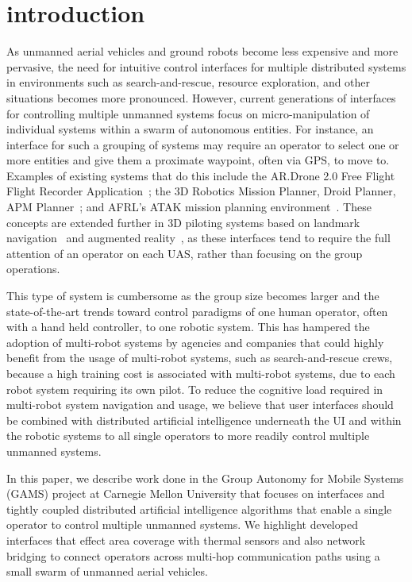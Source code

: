 \documentclass{sig-alternate-ipsn13}
\begin{document}
\section{introduction}

As unmanned aerial vehicles and ground robots become less expensive and more
pervasive, the need for intuitive control interfaces for multiple distributed
systems in environments such as search-and-rescue, resource exploration, and
other situations becomes more pronounced. However, current generations of
interfaces for controlling multiple unmanned systems focus on micro-manipulation
of individual systems within a swarm of autonomous entities. For instance, an
interface for such a grouping of systems may require an operator to select one
or more entities and give them a proximate waypoint, often via GPS, to move to.
Examples of existing systems that do this include the AR.Drone 2.0 Free Flight
Flight Recorder Application~\cite{irizarry2012usability};
the 3D Robotics Mission Planner, Droid Planner,
APM Planner~\cite{arora2013development}; and AFRL's ATAK mission
planning environment~\cite{gillen2012beyond}.
These concepts are extended further in 3D piloting systems based on landmark
navigation~\cite{ranft20133d} and augmented reality~\cite{kochflying}, as
these interfaces tend to require the full attention
of an operator on each UAS, rather than focusing on the group operations.

This type of system is cumbersome as the group size becomes larger and the
state-of-the-art trends toward control paradigms of one human operator, often
with a hand held controller, to one robotic system. This has hampered the
adoption of multi-robot systems by agencies and companies that could highly
benefit from the usage of multi-robot systems, such as search-and-rescue crews,
because a high training cost is associated with multi-robot systems, due to each
robot system requiring its own pilot. To reduce the cognitive load required in
multi-robot system navigation and usage, we believe that user interfaces should
be combined with distributed artificial intelligence underneath the UI and
within the robotic systems to all single operators to more readily control
multiple unmanned systems.

In this paper, we describe work done in the Group Autonomy for Mobile Systems
(GAMS) project at Carnegie Mellon University that focuses on interfaces and
tightly coupled distributed artificial intelligence algorithms that enable a single
operator to control multiple unmanned systems. We highlight developed interfaces
that effect area coverage with thermal sensors and also network bridging to
connect operators across multi-hop communication paths using a small swarm of
unmanned aerial vehicles.
\end{document}
